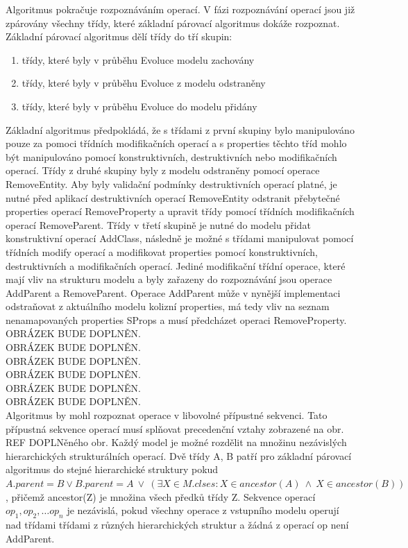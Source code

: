 \documentclass[11pt,twoside,a4paper]{book}
\begin{document}
Algoritmus pokračuje rozpoznáváním operací. V fázi rozpoznávání operací jsou
již zpárovány všechny třídy, které základní párovací algoritmus dokáže
rozpoznat. Základní párovací algoritmus dělí třídy do tří skupin:
\begin{enumerate}
   \item třídy, které byly v průběhu Evoluce modelu zachovány
   \item třídy, které byly v průběhu Evoluce z modelu odstraněny
   \item třídy, které byly v průběhu Evoluce do modelu přidány
\end{enumerate}

Základní algoritmus předpokládá, že s třídami z první skupiny bylo manipulováno
pouze za pomoci třídních modifikačních operací a s
properties těchto tříd mohlo být manipulováno pomocí konstruktivních,
destruktivních nebo modifikačních operací. Třídy z druhé skupiny byly z modelu
odstraněny pomocí operace RemoveEntity. Aby byly validační podmínky
destruktivních operací platné, je nutné před aplikací destruktivních operací
RemoveEntity odstranit přebytečné properties operací RemoveProperty a upravit
třídy pomocí třídních modifikačních operací RemoveParent. Třídy v třetí skupině
je nutné do modelu přidat konstruktivní operací AddClass, následně je možné s
třídami manipulovat pomocí třídních modify operací a modifikovat properties
pomocí konstruktivních, destruktivních a modifikačních operací.
Jediné modifikační třídní operace, které mají vliv na strukturu modelu a byly
zařazeny do rozpoznávání jsou operace AddParent a RemoveParent. Operace
AddParent může v nynější implementaci odstraňovat z aktuálního modelu
kolizní properties, má tedy vliv na seznam nenamapovaných properties SProps a
musí předcházet operaci RemoveProperty. 
\\
OBRÁZEK BUDE DOPLNĚN.\\
OBRÁZEK BUDE DOPLNĚN.\\
OBRÁZEK BUDE DOPLNĚN.\\
OBRÁZEK BUDE DOPLNĚN.\\
OBRÁZEK BUDE DOPLNĚN.\\
OBRÁZEK BUDE DOPLNĚN.\\
 Algoritmus by mohl rozpoznat operace v libovolné přípustné sekvenci. Tato
 přípustná sekvence operací musí splňovat precedenční vztahy zobrazené na obr.
 REF DOPLNěného obr. Každý model je možné rozdělit na množinu nezávislých
 hierarchických strukturálních operací. Dvě třídy A, B patří pro základní
 párovací algoritmus do stejné hierarchické struktury pokud $A.parent = B \vee
 B.parent = A \ \vee \ (\exists X \in M.clses: X \in ancestor(A)\ \wedge\ X \in
 ancestor(B))$, přičemž ancestor(Z) je množina všech předků třídy Z. Sekvence
 operací $op_1, op_2, \ldots op_n$ je nezávislá, pokud všechny operace z
 vstupního modelu operují nad třídami třídami z různých hierarchických struktur
  a žádná z operací op není AddParent. 
  
\end{document}
